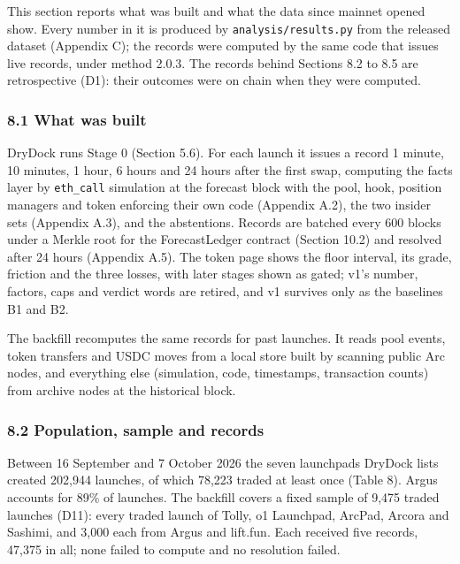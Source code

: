 This section reports what was built and what the data since mainnet opened show. Every number in it is produced by \texttt{analysis/results.py} from the released dataset (Appendix C); the records were computed by the same code that issues live records, under method 2.0.3. The records behind Sections 8.2 to 8.5 are retrospective (D1): their outcomes were on chain when they were computed.

\subsubsection{8.1 What was built}\label{what-was-built}

DryDock runs Stage 0 (Section 5.6). For each launch it issues a record 1 minute, 10 minutes, 1 hour, 6 hours and 24 hours after the first swap, computing the facts layer by \texttt{eth\_call} simulation at the forecast block with the pool, hook, position managers and token enforcing their own code (Appendix A.2), the two insider sets (Appendix A.3), and the abstentions. Records are batched every 600 blocks under a Merkle root for the ForecastLedger contract (Section 10.2) and resolved after 24 hours (Appendix A.5). The token page shows the floor interval, its grade, friction and the three losses, with later stages shown as gated; v1's number, factors, caps and verdict words are retired, and v1 survives only as the baselines B1 and B2.

The backfill recomputes the same records for past launches. It reads pool events, token transfers and USDC moves from a local store built by scanning public Arc nodes, and everything else (simulation, code, timestamps, transaction counts) from archive nodes at the historical block.

\subsubsection{8.2 Population, sample and records}\label{population-sample-and-records}

Between 16 September and 7 October 2026 the seven launchpads DryDock lists created 202,944 launches, of which 78,223 traded at least once (Table 8). Argus accounts for 89\% of launches. The backfill covers a fixed sample of 9,475 traded launches (D11): every traded launch of Tolly, o1 Launchpad, ArcPad, Arcora and Sashimi, and 3,000 each from Argus and lift.fun. Each received five records, 47,375 in all; none failed to compute and no resolution failed.

